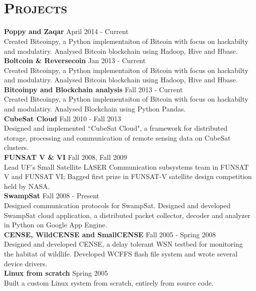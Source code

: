\begin{resume}
\begin{formatb}
  \\
  \body\\
\end{formatb}

\section{\textsc{Projects}}
\textbf{Poppy and Zaqar} \hfill April 2014 - Current\\
Created Bitcoinpy, a Python implementaiton of Bitcoin with focus on hackabilty and modulatiry. Analysed Bitcoin blockchain using Hadoop, Hive and Hbase.\\
\textbf{Boltcoin \& Reversecoin } \hfill Jan 2013 - Current\\
Created Bitcoinpy, a Python implementaiton of Bitcoin with focus on hackabilty and modulatiry. Analysed Bitcoin blockchain using Hadoop, Hive and Hbase.\\
\textbf{Bitcoinpy and Blockchain analysis} \hfill Fall 2013 - Current\\
Created Bitcoinpy, a Python implementaiton of Bitcoin with focus on hackabilty and modulatiry. Analysed Blockchain using Python Pandas.\\
\textbf{CubeSat Cloud} \hfill Fall 2010 - Fall 2013 \\
Designed and implemented ``CubeSat Cloud", a framework for distributed storage, processing and communication of remote sensing data on CubeSat clusters.\\
\textbf{FUNSAT V \& VI} \hfill Fall 2008, Fall 2009 \\
Lead UF's Small Satellite LASER Communication subsystems team in FUNSAT V and FUNSAT VI; Bagged first prize in FUNSAT-V satellite design competition held by NASA.\\
\textbf{SwampSat} \hfill Fall 2008 - Present \\
Designed communication protocols for SwampSat. Designed and developed SwampSat cloud application, a distributed packet collector, decoder and analyzer in Python on Google App Engine.\\
\textbf{CENSE, WildCENSE and SmallCENSE} \hfill Fall 2005 - Spring 2008 \\
Designed and developed CENSE, a delay tolerant WSN testbed for monitoring the habitat of wildlife. Developed WCFFS flash file system and wrote several device drivers.\\
\textbf{Linux from scratch} \hfill Spring 2005 \\
Built a custom Linux system from scratch, entirely from source code.


\end{resume}
